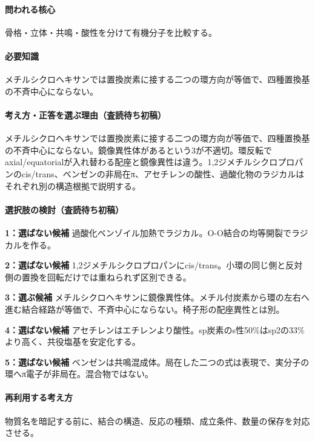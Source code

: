 \paragraph{問われる核心} 骨格・立体・共鳴・酸性を分けて有機分子を比較する。

\paragraph{必要知識} メチルシクロヘキサンでは置換炭素に接する二つの環方向が等価で、四種置換基の不斉中心にならない。

\paragraph{考え方・正答を選ぶ理由（査読待ち初稿）} メチルシクロヘキサンでは置換炭素に接する二つの環方向が等価で、四種置換基の不斉中心にならない。鏡像異性体があるという3が不適切。環反転でaxial/equatorialが入れ替わる配座と鏡像異性は違う。1,2ジメチルシクロプロパンのcis/trans、ベンゼンの非局在π、アセチレンの酸性、過酸化物のラジカルはそれぞれ別の構造根拠で説明する。

\paragraph{選択肢の検討（査読待ち初稿）}\mbox{}\par

\noindent\textbf{1：選ばない候補} 過酸化ベンゾイル加熱でラジカル。O-O結合の均等開裂でラジカルを作る。\par

\noindent\textbf{2：選ばない候補} 1,2ジメチルシクロプロパンにcis/trans。小環の同じ側と反対側の置換を回転だけでは重ねられず区別できる。\par

\noindent\textbf{3：選ぶ候補} メチルシクロヘキサンに鏡像異性体。メチル付炭素から環の左右へ進む結合経路が等価で、不斉中心にならない。椅子形の配座異性とは別。\par

\noindent\textbf{4：選ばない候補} アセチレンはエチレンより酸性。sp炭素のs性50\%はsp2の33\%より高く、共役塩基を安定化する。\par

\noindent\textbf{5：選ばない候補} ベンゼンは共鳴混成体。局在した二つの式は表現で、実分子の環へπ電子が非局在。混合物ではない。\par

\paragraph{再利用する考え方} 物質名を暗記する前に、結合の構造、反応の種類、成立条件、数量の保存を対応させる。

